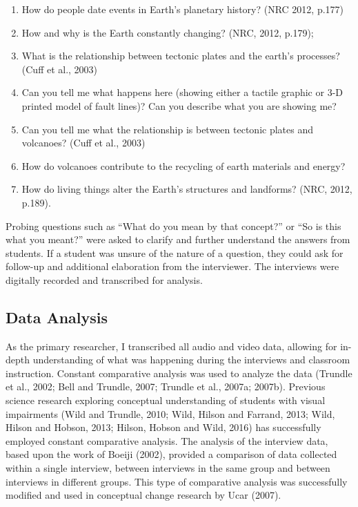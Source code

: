 \documentclass[11.5pt]{sig-alternate} %
\begin{document}
\begin{large}
\begin{enumerate}
     \item How do people date events in Earth’s planetary history? (NRC 2012,  p.177)
     \item How and why is the Earth constantly changing? (NRC, 2012, p.179);
     \item What is the relationship between tectonic plates and the earth’s processes? (Cuff et al., 2003)
     \item Can you tell me what happens here (showing either a tactile graphic or 3-D printed model of fault lines)?  Can you describe what you are showing me?
     \item Can you tell me what the relationship is between tectonic plates and volcanoes?  (Cuff et al., 2003)
     \item How do volcanoes contribute to the recycling of earth materials and energy?
     \item How do living things alter the Earth’s structures and landforms? (NRC, 2012, p.189).
\end{enumerate}
 
Probing questions such as “What do you mean by that concept?” or “So is this what you meant?”  were asked to clarify and further understand the answers from students.  If a student was unsure of the nature of a question, they could ask for follow-up and additional elaboration from the interviewer.  The interviews were digitally recorded and transcribed for analysis.     

\subsection*{Data Analysis}

As the primary researcher, I transcribed all audio and video data, allowing for in-depth understanding of what was happening during the interviews and classroom instruction.  Constant comparative analysis was used to analyze the data (Trundle et al., 2002; Bell and Trundle, 2007; Trundle et al., 2007a; 2007b).  Previous science research exploring conceptual understanding of students with visual impairments (Wild and Trundle, 2010; Wild, Hilson and Farrand, 2013; Wild, Hilson and Hobson, 2013; Hilson, Hobson and Wild, 2016) has successfully employed constant comparative analysis.  The analysis of the interview data, based upon the work of Boeiji (2002), provided a comparison of data collected within a single interview, between interviews in the same group and between interviews in different groups.  This type of comparative analysis was successfully modified and used in conceptual change research by Ucar (2007).  


\end{large}
\end{document}
